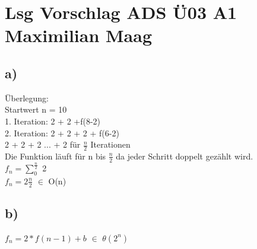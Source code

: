 \documentclass{article}
\begin{document}
	\section*{Lsg Vorschlag ADS Ü03 A1 Maximilian Maag}
	\subsection*{a)}
	Überlegung: \\
	Startwert n = 10 \\
	1. Iteration: 2 + 2 +f(8-2) \\
	2. Iteration: 2 + 2 + 2 + f(6-2) \\
	2 + 2 + 2 ... + 2 für $\frac{n}{2}$  Iterationen \\
	Die Funktion läuft für n bis $\frac{n}{2}$ da jeder Schritt doppelt gezählt wird. \\
	$f_{n} = \sum_{0}^{\frac{n}{2}}$ 2 \\
	$f_{n} = 2\frac{n}{2}$ $\in$ O(n)\\
	\subsection*{b)}
	$f_{n} = 2*f(n-1) + b$ $\in$ $\theta$$(2^n)$\\


	
\end{document}
